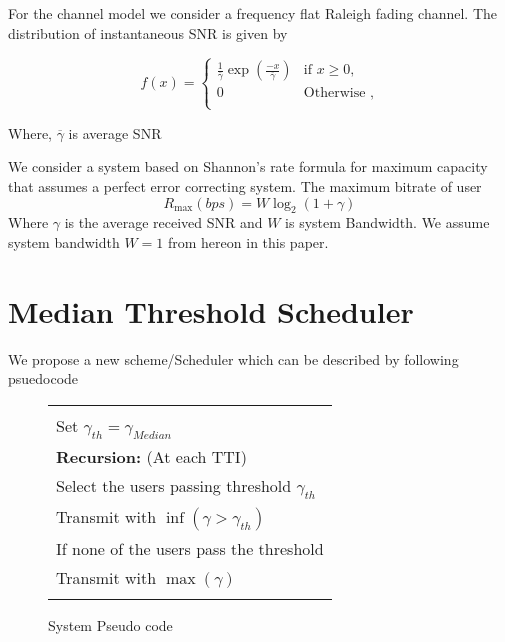 \documentclass[conference]{IEEEtran}
\begin{document}
For the channel model we consider a frequency flat Raleigh fading channel. The distribution of instantaneous SNR is given by

\begin{equation} \label{equ: Exp variable}
f(x) =
\begin{cases}
\frac{1}{\overline{\gamma }}\exp \left( \frac{-x}{\overline{\gamma }} \right) & \text{if } x\ge {0},\\
0 & \text{Otherwise } ,\\

\end{cases}
\end{equation}

Where, $\overline{\gamma}$ is average SNR 

\label{1} 


We consider a system based on Shannon\textquoteright s rate formula for maximum capacity that assumes a perfect error correcting system. The maximum bitrate of user 
\[{{R}_{\max }}(bps)=W{{\log }_{2}}\left( 1+\gamma  \right)\]
Where $\gamma$ is the average received SNR and $W$ is system Bandwidth. We assume system bandwidth $W=1$ from hereon in this paper.



\section{Median Threshold Scheduler}

We propose a new scheme/Scheduler which can be described by following psuedocode\\
\begin{figure}[h!]
\begin{center}\small
\begin{tabular}{|l|}\hline
\begin{minipage}{0.9\hsize}
\vspace{3mm}

\textbf{Intialization:}\\
Set ${{\gamma }_{th}}={{\gamma }_{Median}}$ \\
\textbf{Recursion:} (At each TTI)\\
Select the users passing threshold ${{\gamma }_{th}}$ \\
Transmit with $\inf \left( \gamma >{{\gamma }_{th}} \right)$ \\
If none of the users pass the threshold \\
Transmit with $\max \left( \gamma  \right)$\\ 
\vspace{1mm}
\end{minipage} \\ \hline
\end{tabular}
\end{center}
\caption{System Pseudo code}
\label{Pseudo-code}

\end{figure}
\end{document}
